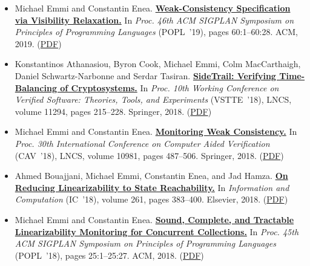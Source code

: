 \documentclass{article}
\begin{document}
\begin{itemize}[leftmargin=0cm,label={}]
    \item Michael Emmi and Constantin Enea. {\bf\href{%
    https://dl.acm.org/citation.cfm?id=3290373}{%
    Weak-Consistency Specification via Visibility Relaxation.}} In \emph{ Proc. 46th ACM SIGPLAN Symposium on Principles of Programming Languages } (POPL ’19), pages 60:1–60:28. ACM, 2019. (\href{https://michael-emmi.github.io/https://github.com/michael-emmi/research-papers/raw/master/conf-popl-EmmiE19.pdf}{PDF})


    \item Konstantinos Athanasiou, Byron Cook, Michael Emmi, Colm MacCarthaigh, Daniel Schwartz-Narbonne and Serdar Tasiran. {\bf\href{%
    https://doi.org/10.1007/978-3-030-03592-1_12}{%
    SideTrail: Verifying Time-Balancing of Cryptosystems.}} In \emph{ Proc. 10th Working Conference on Verified Software: Theories, Tools, and Experiments } (VSTTE ’18), LNCS, volume 11294, pages 215–228. Springer, 2018. (\href{https://michael-emmi.github.io/https://github.com/michael-emmi/research-papers/raw/master/conf-vstte-AthanasiouCEMST18.pdf}{PDF})


    \item Michael Emmi and Constantin Enea. {\bf\href{%
    https://doi.org/10.1007/978-3-319-96145-3_26}{%
    Monitoring Weak Consistency.}} In \emph{ Proc. 30th International Conference on Computer Aided Verification } (CAV ’18), LNCS, volume 10981, pages 487–506. Springer, 2018. (\href{https://michael-emmi.github.io/https://github.com/michael-emmi/research-papers/raw/master/conf-cav-EmmiE18.pdf}{PDF})


    \item Ahmed Bouajjani, Michael Emmi, Constantin Enea, and Jad Hamza. {\bf\href{%
    https://doi.org/10.1016/j.ic.2018.02.014}{%
    On Reducing Linearizability to State Reachability.}} In \emph{ Information and Computation } (IC ’18), volume 261, pages 383–400. Elsevier, 2018. (\href{https://michael-emmi.github.io/https://github.com/michael-emmi/research-papers/raw/master/journals-iandc-BouajjaniEEH18.pdf}{PDF})


    \item Michael Emmi and Constantin Enea. {\bf\href{%
    http://doi.acm.org/10.1145/3158113}{%
    Sound, Complete, and Tractable Linearizability Monitoring for Concurrent Collections.}} In \emph{ Proc. 45th ACM SIGPLAN Symposium on Principles of Programming Languages } (POPL ’18), pages 25:1–25:27. ACM, 2018. (\href{https://michael-emmi.github.io/https://github.com/michael-emmi/research-papers/raw/master/conf-popl-EmmiE18.pdf}{PDF})



\end{itemize}
\end{document}
